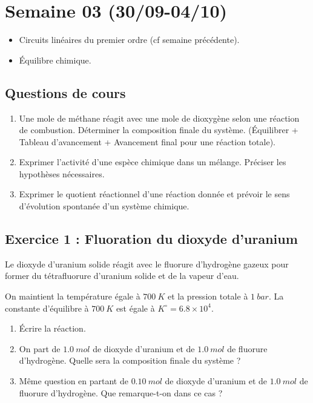 \section{Semaine 03 (30/09-04/10) }


\begin{itemize}
	\item Circuits linéaires du premier ordre (cf semaine précédente).
	\item Équilibre chimique.
\end{itemize}

\subsection{Questions de cours}
\begin{enumerate}
	\item Une mole de méthane réagit avec une mole de dioxygène selon une réaction de combustion. Déterminer la composition finale du système. (Équilibrer + Tableau d'avancement + Avancement final pour une réaction totale).
	\item Exprimer l'activité d'une espèce chimique dans un mélange. Préciser les hypothèses nécessaires.
	\item Exprimer le quotient réactionnel d'une réaction donnée et prévoir le sens d'évolution spontanée d'un système chimique.
\end{enumerate}

\subsection{Exercice 1 : Fluoration du dioxyde d'uranium}

Le dioxyde d'uranium solide réagit avec le fluorure d'hydrogène gazeux pour former du tétrafluorure d'uranium solide et de la vapeur d'eau. 

On maintient la température égale à $\SI{700}{K}$ et la pression totale à $\SI{1}{bar}$. La constante d'équilibre à $\SI{700}{K}$ est égale à $K^\circ = 6.8\times10^4$.

\begin{enumerate}
	\item Écrire la réaction.
	\item On part de $\SI{1.0}{mol}$ de dioxyde d'uranium et de $\SI{1.0}{mol}$ de fluorure d'hydrogène. Quelle sera la composition finale du système ?
	\item Même question en partant de $\SI{0.10}{mol}$ de dioxyde d'uranium et de $\SI{1.0}{mol}$ de fluorure d'hydrogène. Que remarque-t-on dans ce cas ?  
\end{enumerate}

